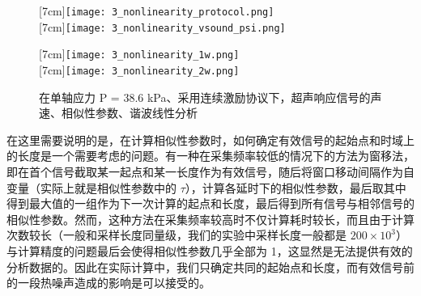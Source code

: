 \begin{figure}[!hbtp]
  \centering
	\begin{minipage}[!hbtp]{0.48\columnwidth}
		\centering
		[7cm]{\texttt{[image: 3\_nonlinearity\_protocol.png]}}
		\\
    [7cm]{\texttt{[image: 3\_nonlinearity\_vsound\_psi.png]}}
	\end{minipage}
	\begin{minipage}[!hbtp]{0.48\columnwidth}
		\centering
		[7cm]{\texttt{[image: 3\_nonlinearity\_1w.png]}}
		\\
    [7cm]{\texttt{[image: 3\_nonlinearity\_2w.png]}}
	\end{minipage}
	\caption{在单轴应力 P = 38.6 \unit{\kilo\pascal}、采用连续激励协议下，超声响应信号的声速、相似性参数、谐波线性分析\label{fig:nonlinearity}}
\end{figure}

在这里需要说明的是，在计算相似性参数时，如何确定有效信号的起始点和时域上的长度是一个需要考虑的问题。有一种在采集频率较低的情况下的方法为窗移法，即在首个信号截取某一起点和某一长度作为有效信号，随后将窗口移动间隔作为自变量（实际上就是相似性参数中的 $\tau$），计算各延时下的相似性参数，最后取其中得到最大值的一组作为下一次计算的起点和长度，最后得到所有信号与相邻信号的相似性参数。然而，这种方法在采集频率较高时不仅计算耗时较长，而且由于计算次数较长（一般和采样长度同量级，我们的实验中采样长度一般都是 $200\times 10^{3}$）与计算精度的问题最后会使得相似性参数几乎全部为 1，这显然是无法提供有效的分析数据的。因此在实际计算中，我们只确定共同的起始点和长度，而有效信号前的一段热噪声造成的影响是可以接受的。

